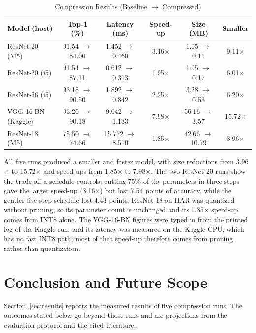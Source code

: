 \documentclass[oneside,a4paper,12pt]{report}
\begin{document}
\begin{table}[H]
\centering
\small
\setlength{\tabcolsep}{3.5pt}
\begin{tabular}{@{}l c c c c c@{}}
\toprule
\textbf{Model (host)} & \textbf{Top-1 (\%)} & \textbf{Latency (ms)} & \textbf{Speed-up} & \textbf{Size (MB)} & \textbf{Smaller}\\
\midrule
ResNet-20 (M5)     & 91.54 $\to$ 84.00 & 1.452 $\to$ 0.460  & 3.16$\times$ & 1.05 $\to$ 0.11  & 9.11$\times$ \\
ResNet-20 (i5)     & 91.54 $\to$ 87.11 & 0.612 $\to$ 0.313  & 1.95$\times$ & 1.05 $\to$ 0.17  & 6.01$\times$ \\
ResNet-56 (i5)     & 93.18 $\to$ 90.50 & 1.892 $\to$ 0.842  & 2.25$\times$ & 3.28 $\to$ 0.53  & 6.20$\times$ \\
VGG-16-BN (Kaggle) & 93.20 $\to$ 90.18 & 9.042 $\to$ 1.133  & 7.98$\times$ & 56.16 $\to$ 3.57 & 15.72$\times$\\
ResNet-18 (M5)     & 75.50 $\to$ 74.66 & 15.772 $\to$ 8.510 & 1.85$\times$ & 42.66 $\to$ 10.79 & 3.96$\times$\\
\bottomrule
\end{tabular}
\caption{Compression Results (Baseline $\to$ Compressed)}
\label{tab:results}
\end{table}

All five runs produced a smaller and faster model, with size reductions from 3.96$\times$ to 15.72$\times$ and speed-ups from 1.85$\times$ to 7.98$\times$. The two ResNet-20 runs show the trade-off a schedule controls: cutting 75\% of the parameters in three steps gave the larger speed-up (3.16$\times$) but lost 7.54 points of accuracy, while the gentler five-step schedule lost 4.43 points. ResNet-18 on HAR was quantized without pruning, so its parameter count is unchanged and its 1.85$\times$ speed-up comes from INT8 alone. The VGG-16-BN figures were typed in from the printed log of the Kaggle run, and its latency was measured on the Kaggle CPU, which has no fast INT8 path; most of that speed-up therefore comes from pruning rather than quantization.



     
\chapter{Conclusion and Future Scope}
Section~\ref{sec:results} reports the measured results of five compression runs. The outcomes stated below go beyond those runs and are projections from the evaluation protocol and the cited literature.
\end{document}
